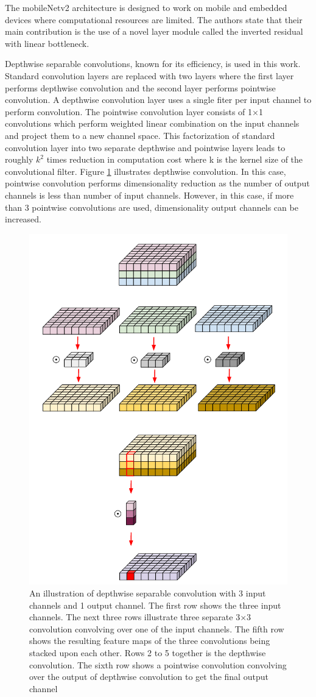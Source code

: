 The mobileNetv2 architecture is designed to work on mobile and embedded devices where computational resources are limited. The authors state that their main contribution is the use of a novel layer module called the inverted residual with linear bottleneck. 

Depthwise separable convolutions, known for its efficiency, is used in this work. Standard convolution layers are replaced with two layers where the first layer performs depthwise convolution and the second layer performs pointwise convolution. A depthwise convolution layer uses a single fiter per input channel to perform convolution. The pointwise convolution layer consists of 1$\times$1 convolutions which perform weighted linear combination on the input channels and project them to a new channel space. This factorization of standard convolution layer into two separate depthwise and pointwise layers leads to roughly $k^2$ times reduction in computation cost where k is the kernel size of the convolutional filter. Figure \ref{Fig:depthwise} illustrates depthwise convolution. In this case, pointwise convolution performs dimensionality reduction as the number of output channels is less than number of input channels. However, in this case, if more than 3 pointwise convolutions are used, dimensionality output channels can be increased.

	\begin{figure}[!htb]
		\centering
		\includegraphics[width=.5\linewidth]{images/depthwise}
		\caption{An illustration of depthwise separable convolution with 3 input channels and 1 output channel. The first row shows the three input channels. The next three rows illustrate three separate 3$\times$3 convolution convolving over one of the input channels. The fifth row shows the resulting feature maps of the three convolutions being stacked upon each other. Rows 2 to 5 together is the depthwise convolution. The sixth row shows a pointwise convolution convolving over the output of depthwise convolution to get the final output channel}
		\label{Fig:depthwise}
	\end{figure}

